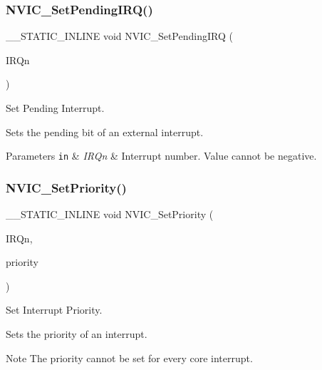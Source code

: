 \subsubsection{\texorpdfstring{N\+V\+I\+C\+\_\+\+Set\+Pending\+I\+R\+Q()}{NVIC\_SetPendingIRQ()}}
{\footnotesize\ttfamily \+\_\+\+\_\+\+S\+T\+A\+T\+I\+C\+\_\+\+I\+N\+L\+I\+NE void N\+V\+I\+C\+\_\+\+Set\+Pending\+I\+RQ (\begin{DoxyParamCaption}\item[{\mbox{\hyperlink{group___peripheral__interrupt__number__definition_ga7e1129cd8a196f4284d41db3e82ad5c8}{I\+R\+Qn\+\_\+\+Type}}}]{I\+R\+Qn }\end{DoxyParamCaption})}



Set Pending Interrupt. 

Sets the pending bit of an external interrupt. 
\begin{DoxyParams}[1]{Parameters}
\mbox{\tt in}  & {\em I\+R\+Qn} & Interrupt number. Value cannot be negative. \\
\hline
\end{DoxyParams}
\mbox{\label{group___c_m_s_i_s___core___n_v_i_c_functions_ga2305cbd44aaad792e3a4e538bdaf14f9}} 
\subsubsection{\texorpdfstring{N\+V\+I\+C\+\_\+\+Set\+Priority()}{NVIC\_SetPriority()}}
{\footnotesize\ttfamily \+\_\+\+\_\+\+S\+T\+A\+T\+I\+C\+\_\+\+I\+N\+L\+I\+NE void N\+V\+I\+C\+\_\+\+Set\+Priority (\begin{DoxyParamCaption}\item[{\mbox{\hyperlink{group___peripheral__interrupt__number__definition_ga7e1129cd8a196f4284d41db3e82ad5c8}{I\+R\+Qn\+\_\+\+Type}}}]{I\+R\+Qn,  }\item[{uint32\+\_\+t}]{priority }\end{DoxyParamCaption})}



Set Interrupt Priority. 

Sets the priority of an interrupt. \begin{DoxyNote}{Note}
The priority cannot be set for every core interrupt. 
\end{DoxyNote}

